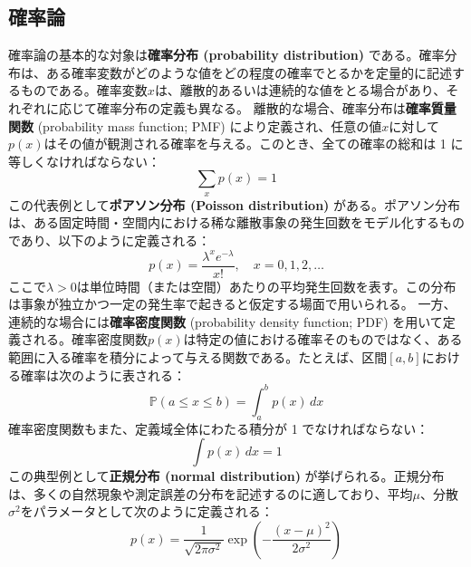\subsection{確率論}
確率論の基本的な対象は\textbf{確率分布 (probability distribution)} である。確率分布は、ある確率変数がどのような値をどの程度の確率でとるかを定量的に記述するものである。確率変数$x$は、離散的あるいは連続的な値をとる場合があり、それぞれに応じて確率分布の定義も異なる。
離散的な場合、確率分布は\textbf{確率質量関数} (probability mass function; PMF) により定義され、任意の値$x$に対して$p(x)$はその値が観測される確率を与える。このとき、全ての確率の総和は 1 に等しくなければならない：
\begin{equation}
\sum_x p(x) = 1
\end{equation}
この代表例として\textbf{ポアソン分布 (Poisson distribution)} がある。ポアソン分布は、ある固定時間・空間内における稀な離散事象の発生回数をモデル化するものであり、以下のように定義される：
\begin{equation}
p(x) = \frac{\lambda^x e^{-\lambda}}{x!}, \quad x = 0,1,2,\dots
\end{equation}
ここで$\lambda > 0$は単位時間（または空間）あたりの平均発生回数を表す。この分布は事象が独立かつ一定の発生率で起きると仮定する場面で用いられる。
一方、連続的な場合には\textbf{確率密度関数} (probability density function; PDF) を用いて定義される。確率密度関数$p(x)$は特定の値における確率そのものではなく、ある範囲に入る確率を積分によって与える関数である。たとえば、区間$[a,b]$における確率は次のように表される：
\begin{equation}
\mathbb{P}(a \leq x \leq b) = \int_a^b p(x)\,dx
\end{equation}
確率密度関数もまた、定義域全体にわたる積分が 1 でなければならない：
\begin{equation}
\int p(x)\,dx = 1
\end{equation}
この典型例として\textbf{正規分布 (normal distribution)} が挙げられる。正規分布は、多くの自然現象や測定誤差の分布を記述するのに適しており、平均$\mu$、分散$\sigma^2$をパラメータとして次のように定義される：
\begin{equation}
p(x) = \frac{1}{\sqrt{2\pi \sigma^2}} \exp\left( -\frac{(x - \mu)^2}{2\sigma^2} \right)
\end{equation}
